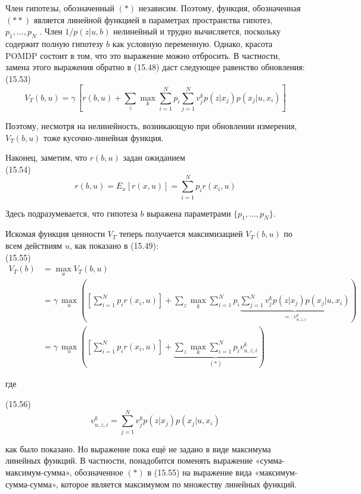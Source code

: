 \documentclass[10pt,a4paper]{article}
\begin{document}
Член гипотезы, обозначенный $(\ast)$ независим. Поэтому, функция, обозначенная $(\ast\ast)$ является линейной функцией в параметрах пространства гипотез, $p_1,..., p_N$ . Член $1/p(z | u, b)$ нелинейный и трудно вычисляется, поскольку содержит полную гипотезу $b$ как условную переменную. Однако, красота POMDP состоит в том, что это выражение можно отбросить. В частности, замена этого выражения обратно в  (15.48) даст следующее равенство обновления:\\

(15.53)
$$V_T(b,u)=\gamma\,\left[ r(b,u)+\sum_z\underset{k}{\max}\sum_{i=1}^Np_i\sum_{j=1}^Nv_j^kp(z|x_j)p(x_j|u,x_i)\right] $$

Поэтому, несмотря на нелинейность, возникающую при обновлении измерения, $V_T (b, u)$ тоже кусочно-линейная функция.

Наконец, заметим, что $r(b, u)$ задан ожиданием\\

(15.54)
$$r(b,u)=E_x[r(x,u)]=\sum_{i=1}^Np_ir(x_i,u)$$

Здесь подразумевается, что гипотеза $b$ выражена параметрами
$\{p_1,..., p_N \}$.

Искомая функция ценности $V_T$  теперь получается максимизацией $V_T(b, u)$
по всем действиям $u$, как показано в (15.49):\\

(15.55)
\begin{equation*}
\begin{split}
V_T(b)&=\underset{u}{\max}V_T(b,u)\\
&=\gamma\,\underset{u}{\max}\left( \left[ \sum_{i=1}^N p_ir(x_i,u)\right]+ \sum_z\underset{k}{\max}\sum_{i=1}^Np_i\underbrace{\sum_{j=1}^N v_j^kp(z|x_j)p(x_j|u,x_i)}_{=:v_{u,z,i}^k} \right)   \\
&=\gamma\,\underset{u}{\max}\left( \left[ \sum_{i=1}^N p_ir(x_i,u)\right]+\underbrace{\sum_z\underset{k}{\max}\sum_{i=1}^N p_iv_{u,z,i}^k}_{(\ast)}\right) 
\end{split}
\end{equation*}

где

(15.56)
$$v_{u,z,i}^k=\sum_{j=1}^N v_j^kp(z|x_j)p(x_j|u,x_i)$$

как было показано. Но выражение пока ещё не задано в виде максимума линейных функций. В частности, понадобится поменять выражение «сумма-максимум-сумма», обозначенное $(\ast)$ в (15.55) на выражение вида «максимум-сумма-сумма», которое является максимумом по множеству линейных функций.
\end{document}
